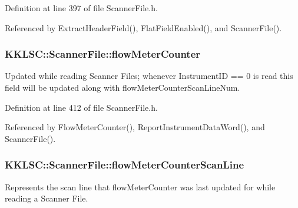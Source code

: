 Definition at line 397 of file Scanner\+File.\+h.



Referenced by Extract\+Header\+Field(), Flat\+Field\+Enabled(), and Scanner\+File().

\subsubsection[{\texorpdfstring{flow\+Meter\+Counter}{flowMeterCounter}}]{ K\+K\+L\+S\+C\+::\+Scanner\+File\+::flow\+Meter\+Counter\hspace{0.3cm}{\ttfamily [protected]}}\hypertarget{class_k_k_l_s_c_1_1_scanner_file_a4713a0fd6dabc99dec0fbeca2868b156}{}\label{class_k_k_l_s_c_1_1_scanner_file_a4713a0fd6dabc99dec0fbeca2868b156}
Updated while reading Scanner Files; whenever Instrument\+ID == 0 is read this field will be updated along with \textquotesingle{}flow\+Meter\+Counter\+Scan\+Line\+Num\textquotesingle{}. 

Definition at line 412 of file Scanner\+File.\+h.



Referenced by Flow\+Meter\+Counter(), Report\+Instrument\+Data\+Word(), and Scanner\+File().

\subsubsection[{\texorpdfstring{flow\+Meter\+Counter\+Scan\+Line}{flowMeterCounterScanLine}}]{ K\+K\+L\+S\+C\+::\+Scanner\+File\+::flow\+Meter\+Counter\+Scan\+Line\hspace{0.3cm}{\ttfamily [protected]}}\hypertarget{class_k_k_l_s_c_1_1_scanner_file_a1e194b239e06b9ba36b75725a2c2e37c}{}\label{class_k_k_l_s_c_1_1_scanner_file_a1e194b239e06b9ba36b75725a2c2e37c}
Represents the scan line that \textquotesingle{}flow\+Meter\+Counter\textquotesingle{} was last updated for while reading a Scanner File. 

